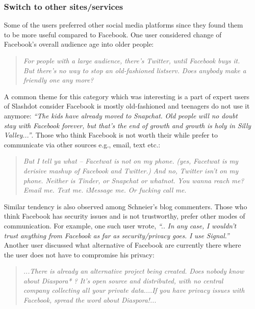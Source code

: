  \subsubsection{Switch to other sites/services}
 Some of the users preferred other social media platforms since they found them to be more useful compared to Facebook. One user considered change of Facebook's overall audience age into older people: 
     \begin{quote}
         \textit{For people with a large audience, there's Twitter, until Facebook buys it. But there's no way to stop an old-fashioned listserv. Does anybody make a friendly one any more? }
     \end{quote}
    A common theme for this category which was interesting is a part of expert users of Slashdot consider Facebook is mostly old-fashioned and teenagers do not use it anymore: \textit{``The kids have already moved to Snapchat. Old people will no doubt stay with Facebook forever, but that's the end of growth and growth is holy in Silly Valley...''}. Those who think Facebook is not worth their while prefer to communicate via other sources e.g., email, text etc.:
    \begin{quote}
         \textit{ But I tell ya what -- Facetwat is not on my phone. (yes, Facetwat is my derisive mashup of Facebook and Twitter.) And no, Twitter isn't on my phone. Neither is Tinder, or Snapchat or whatnot. You wanna reach me? Email me. Text me. iMessage me. Or fucking call me.}
    \end{quote}
    
    Similar tendency is also observed among Schneier's blog commenters. Those who think Facebook has security issues and is not trustworthy, prefer other modes of communication. For example, one such user wrote, \textit{``.. In any case, I wouldn't trust anything from Facebook as far as security/privacy goes. I use Signal.''} Another user discussed what alternative of Facebook are currently there where the user does not have to compromise his privacy:
    \begin{quote}
         \textit{...There is already an alternative project being created. Does nobody know about Diaspora* ? It's open source and distributed, with no central company collecting all your private data....If you have privacy issues with Facebook, spread the word about Diaspora!... }
    \end{quote}
    

 
     
